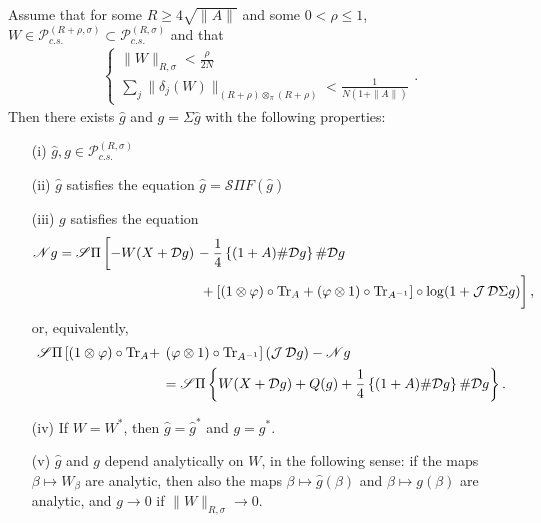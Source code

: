 \begin{prop}\label{g_exists}
Assume that for some $R\geq4\sqrt{\|A\|}$ and some $0<\rho\leq 1$, $W\in\mathscr{P}_{c.s.}^{(R+\rho,\sigma)}\subset\mathscr{P}_{c.s.}^{(R,\sigma)}$ and that
	\begin{align}\label{simple_contractive_data}
			\left\{\begin{array}{l}\|W\|_{R,\sigma}<\frac{\rho}{2N}\\
					   	 \sum_j\|\delta_j(W)\|_{(R+\rho)\otimes_{\pi}(R+\rho)}<\frac{1}{N(1+\|A\|)}\end{array}\right..
	\end{align}
Then there exists $\hat{g}$ and $g=\Sigma \hat{g}$ with the following properties:
	\begin{enumerate}
	\item[(i)] $\hat{g},g\in\mathscr{P}_{c.s.}^{(R,\sigma)}$
	
	\item[(ii)] $\hat{g}$ satisfies the equation $\hat{g}=\mathscr{S}\Pi F(\hat{g})$
	
	\item[(iii)] $g$ satisfies the equation
			\begin{align}\label{hatless_g}
				\mathscr{N} g= \mathscr{S}\Pi\left[ -W(X+\D g) \vphantom{\frac{1}{4}}\right.&- \frac{1}{4}\left\{(1+A)\#\D g\right\}\# \D g\\
														&\left. \vphantom{\frac{1}{4}}+ \left[(1\otimes\varphi)\circ\text{Tr}_{A}+(\varphi\otimes 1)\circ\text{Tr}_{A^{-1}}\right]\circ\log(1+\J\D\Sigma g) \right],\nonumber
			\end{align}
	or, equivalently,
			\begin{align}\label{anti-cyclic_derivative}
				\mathscr{S}\Pi\left[ (1\otimes\varphi)\circ\text{Tr}_A+\right.&\left.(\varphi\otimes 1)\circ\text{Tr}_{A^{-1}}\right](\operatorname{\mathcal J}\mathcal D g) -\mathscr{N}g\\
						&= \mathscr{S}\Pi\left\{ W(X+\mathcal D g)  + Q(g) + \frac{1}{4}\left\{(1+A)\# \mathcal D g\right\}\# \mathcal D g\right\}.\nonumber
			\end{align}
	
	\item[(iv)] If $W=W^*$, then $\hat{g}=\hat{g}^*$ and $g=g^*$.
	
	\item[(v)] $\hat{g}$ and $g$ depend analytically on $W$, in the following sense: if the maps $\beta\mapsto W_\beta$ are analytic, then also the maps $\beta\mapsto \hat{g}(\beta)$ and $\beta\mapsto g(\beta)$ are analytic, and $g\rightarrow 0$ if $\|W\|_{R,\sigma}\rightarrow 0$.
	\end{enumerate}
\end{prop}

